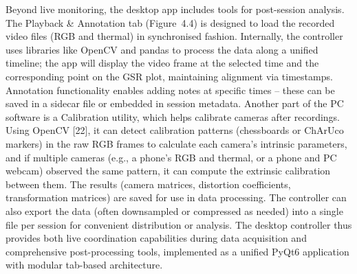 Beyond live monitoring, the desktop app includes tools for post-session analysis. The Playback \& Annotation tab (Figure~4.4) is designed to load the recorded video files (RGB and thermal) in synchronised fashion. Internally, the controller uses libraries like OpenCV and pandas to process the data along a unified timeline; the app will display the video frame at the selected time and the corresponding point on the GSR plot, maintaining alignment via timestamps. Annotation functionality enables adding notes at specific times -- these can be saved in a sidecar file or embedded in session metadata. Another part of the PC software is a Calibration utility, which helps calibrate cameras after recordings. Using OpenCV [22], it can detect calibration patterns (chessboards or ChArUco markers) in the raw RGB frames to calculate each camera's intrinsic parameters, and if multiple cameras (e.g., a phone's RGB and thermal, or a phone and PC webcam) observed the same pattern, it can compute the extrinsic calibration between them. The results (camera matrices, distortion coefficients, transformation matrices) are saved for use in data processing. The controller can also export the data (often downsampled or compressed as needed) into a single file per session for convenient distribution or analysis. The desktop controller thus provides both live coordination capabilities during data acquisition and comprehensive post-processing tools, implemented as a unified PyQt6 application with modular tab-based architecture.

